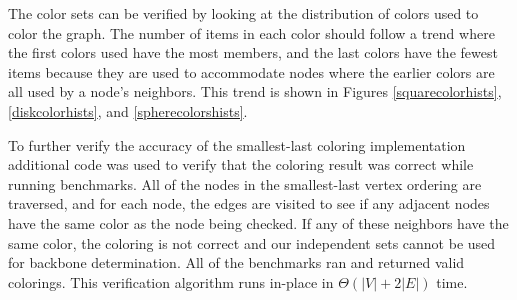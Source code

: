 \documentclass{article}
\begin{document}
        \par
        The color sets can be verified by looking at the distribution of colors used to color the graph. The number of items in each color should follow a trend where the first colors used have the most members, and the last colors have the fewest items because they are used to accommodate nodes where the earlier colors are all used by a node's neighbors. This trend is shown in Figures \ref{squarecolorhists}, \ref{diskcolorhists}, and \ref{spherecolorshists}.
        \par
        To further verify the accuracy of the smallest-last coloring implementation additional code was used to verify that the coloring result was correct while running benchmarks. All of the nodes in the smallest-last vertex ordering are traversed, and for each node, the edges are visited to see if any adjacent nodes have the same color as the node being checked. If any of these neighbors have the same color, the coloring is not correct and our independent sets cannot be used for backbone determination. All of the benchmarks ran and returned valid colorings. This verification algorithm runs in-place in $\Theta(|V| + 2|E|)$ time.
\end{document}
